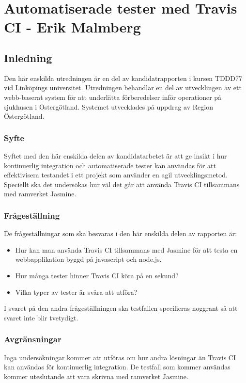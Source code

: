 \section{Automatiserade tester med Travis CI - Erik Malmberg}
\subsection{Inledning}
Den här enskilda utredningen är en del av kandidatrapporten i kursen TDDD77 vid Linköpings universitet.
Utredningen behandlar en del av utvecklingen av ett webb-baserat system för att underlätta förberedelser
inför operationer på sjukhusen i Östergötland. Systemet utvecklades på uppdrag av Region Östergötland.

\subsubsection{Syfte}
Syftet med den här enskilda delen av kandidatarbetet är att ge insikt i hur kontinuerlig integration och 
automatiserade tester kan användas för att effektivisera testandet i ett projekt som använder en agil 
utvecklingsmetod. Speciellt ska det undersökas hur väl det går att använda Travis CI tillsammans med 
ramverket Jasmine.

\subsubsection{Frågeställning}
De frågeställningar som ska besvaras i den här enskilda delen av rapporten är:

\begin{itemize}
\item Hur kan man använda Travis CI tillsammans med Jasmine för att testa en 
webbapplikation byggd på javascript och node.js.
\item Hur många tester hinner Travis CI köra på en sekund?
\item Vilka typer av tester är svåra att utföra?
\end{itemize}

I svaret på den andra frågeställningen ska testfallen specifieras noggrant 
så att svaret inte blir tvetydigt.

\subsubsection{Avgränsningar}
Inga undersökningar kommer att utföras om hur andra lösningar än Travis CI kan användas för kontinuerlig 
integration. De testfall som kommer användas kommer uteslutande att vara skrivna med ramverket Jasmine.

